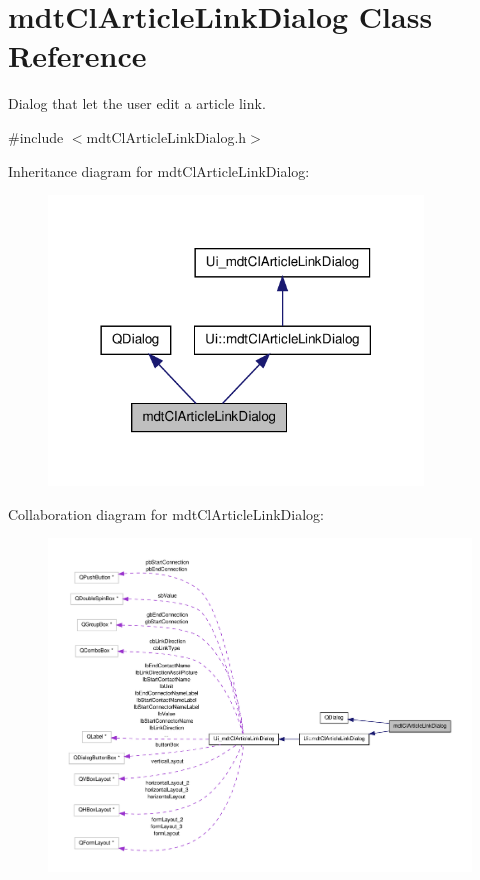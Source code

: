 \hypertarget{classmdt_cl_article_link_dialog}{\section{mdt\-Cl\-Article\-Link\-Dialog Class Reference}
\label{classmdt_cl_article_link_dialog}
}


Dialog that let the user edit a article link.  




{\ttfamily \#include $<$mdt\-Cl\-Article\-Link\-Dialog.\-h$>$}



Inheritance diagram for mdt\-Cl\-Article\-Link\-Dialog\-:\nopagebreak
\begin{figure}[H]
\begin{center}
\leavevmode
\includegraphics[width=282pt]{classmdt_cl_article_link_dialog__inherit__graph}
\end{center}
\end{figure}


Collaboration diagram for mdt\-Cl\-Article\-Link\-Dialog\-:\nopagebreak
\begin{figure}[H]
\begin{center}
\leavevmode
\includegraphics[width=350pt]{classmdt_cl_article_link_dialog__coll__graph}
\end{center}
\end{figure}

